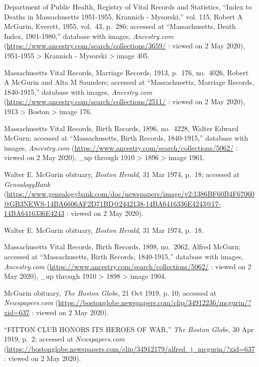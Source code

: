 \begin{thebibliography}{999}
Department of Public Health, Registry of Vital Records and Statistics, ``Index to Deaths in Massachusetts 1951-1955, Krannich - Mysorski,'' vol. 115, Robert A McGurin, Everett, 1955, vol.\ 43, p.\ 286; accessed at ``Massachusetts, Death Index, 1901-1980,'' database with images, \textit{Ancestry.com} (\url{https://www.ancestry.com/search/collections/3659/} : viewed on 2 May 2020), 1951-1955 > Krannich - Mysorski > image 405.

Massachusetts Vital Records, Marriage Records, 1913, p.\ 176, no.\ 4026, Robert A McGurin and Alta M Saunders; accessed at ``Massachusetts, Marriage Records, 1840-1915,'' database with images, \textit{Ancestry.com} (\url{https://www.ancestry.com/search/collections/2511/} : viewed on 2 May 2020), 1913 > Boston > image 176.

Massachusetts Vital Records, Birth Records, 1896, no.\ 4228, Walter Edward McGurn; accessed at ``Massachusetts, Birth Records, 1840-1915,'' database with images, \textit{Ancestry.com} (\url{https://www.ancestry.com/search/collections/5062/} : viewed on 2 May 2020), \_up through 1910 > 1896 > image 1961.

Walter E. McGurin obituary, \textit{Boston Herald}, 31 Mar 1974, p.\ 18; accessed at \textit{GenealogyBank} (\url{https://www.genealogybank.com/doc/newspapers/image/v2:1386BF60B4F67060@GB3NEWS-14BA6606AF2D71BD@2442138-14BA6416336E4243@17-14BA6416336E4243} : viewed on 2 May 2020).

Walter E. McGurin obituary, \textit{Boston Herald}, 31 Mar 1974, p.\ 18.

Massachusetts Vital Records, Birth Records, 1898, no.\ 2062, Alfred McGurn; accessed at ``Massachusetts, Birth Records, 1840-1915,'' database with images, \textit{Ancestry.com} (\url{https://www.ancestry.com/search/collections/5062/} : viewed on 2 May 2020), \_up through 1910 > 1898 > image 1904.

McGurin obituary, \textit{The Boston Globe}, 21 Oct 1919, p. 10; accessed at \textit{Newspapers.com} (\url{https://bostonglobe.newspapers.com/clip/34912236/mcgurin/?xid=637} : viewed on 2 May 2020).

``FITTON CLUB HONORS ITS HEROES OF WAR,'' \textit{The Boston Globe}, 30 Apr 1919, p.\ 2; accessed at \textit{Newspapers.com} (\url{https://bostonglobe.newspapers.com/clip/34912179/alfred_j_mcgurin/?xid=637} : viewed on 2 May 2020).


\end{thebibliography}
